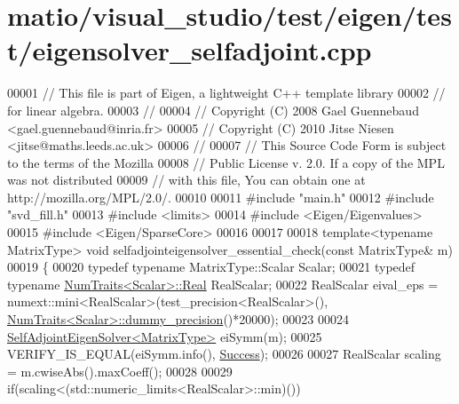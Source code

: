 \hypertarget{matio_2visual__studio_2test_2eigen_2test_2eigensolver__selfadjoint_8cpp_source}{}\section{matio/visual\+\_\+studio/test/eigen/test/eigensolver\+\_\+selfadjoint.cpp}
\label{matio_2visual__studio_2test_2eigen_2test_2eigensolver__selfadjoint_8cpp_source}

\begin{DoxyCode}
00001 \textcolor{comment}{// This file is part of Eigen, a lightweight C++ template library}
00002 \textcolor{comment}{// for linear algebra.}
00003 \textcolor{comment}{//}
00004 \textcolor{comment}{// Copyright (C) 2008 Gael Guennebaud <gael.guennebaud@inria.fr>}
00005 \textcolor{comment}{// Copyright (C) 2010 Jitse Niesen <jitse@maths.leeds.ac.uk>}
00006 \textcolor{comment}{//}
00007 \textcolor{comment}{// This Source Code Form is subject to the terms of the Mozilla}
00008 \textcolor{comment}{// Public License v. 2.0. If a copy of the MPL was not distributed}
00009 \textcolor{comment}{// with this file, You can obtain one at http://mozilla.org/MPL/2.0/.}
00010 
00011 \textcolor{preprocessor}{#include "main.h"}
00012 \textcolor{preprocessor}{#include "svd\_fill.h"}
00013 \textcolor{preprocessor}{#include <limits>}
00014 \textcolor{preprocessor}{#include <Eigen/Eigenvalues>}
00015 \textcolor{preprocessor}{#include <Eigen/SparseCore>}
00016 
00017 
00018 \textcolor{keyword}{template}<\textcolor{keyword}{typename} MatrixType> \textcolor{keywordtype}{void} selfadjointeigensolver\_essential\_check(\textcolor{keyword}{const} MatrixType& m)
00019 \{
00020   \textcolor{keyword}{typedef} \textcolor{keyword}{typename} MatrixType::Scalar Scalar;
00021   \textcolor{keyword}{typedef} \textcolor{keyword}{typename} \hyperlink{group___core___module_struct_eigen_1_1_num_traits}{NumTraits<Scalar>::Real} RealScalar;
00022   RealScalar eival\_eps = numext::mini<RealScalar>(test\_precision<RealScalar>(),  
      \hyperlink{group___core___module_struct_eigen_1_1_num_traits}{NumTraits<Scalar>::dummy\_precision}()*20000);
00023   
00024   \hyperlink{group___eigenvalues___module_class_eigen_1_1_self_adjoint_eigen_solver}{SelfAdjointEigenSolver<MatrixType>} eiSymm(m);
00025   VERIFY\_IS\_EQUAL(eiSymm.info(), \hyperlink{group__enums_gga85fad7b87587764e5cf6b513a9e0ee5ea52581b035f4b59c203b8ff999ef5fcea}{Success});
00026 
00027   RealScalar scaling = m.cwiseAbs().maxCoeff();
00028 
00029   \textcolor{keywordflow}{if}(scaling<(std::numeric\_limits<RealScalar>::min)())

\end{DoxyCode}
